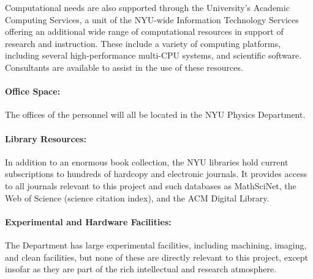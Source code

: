 \documentclass[12pt]{article}
\begin{document}
Computational needs are also supported through the University's
Academic Computing Services, a unit of the NYU-wide Information
Technology Services offering an additional wide range of computational
resources in support of research and instruction.  These include a
variety of computing platforms, including several high-performance
multi-CPU systems, and scientific software.  Consultants are available
to assist in the use of these resources.

\paragraph{Office Space:}

The offices of the personnel will all be located in the NYU Physics
Department.

\paragraph{Library Resources:}

In addition to an enormous book collection, the NYU libraries hold
current subscriptions to hundreds of hardcopy and electronic journals.
It provides access to all journals relevant to this project and such
databases as MathSciNet, the Web of Science (science citation index),
and the ACM Digital Library.

\paragraph{Experimental and Hardware Facilities:}

The Department has large experimental facilities, including machining,
imaging, and clean facilities, but none of these are directly relevant
to this project, except insofar as they are part of the rich
intellectual and research atmosphere.
\end{document}
